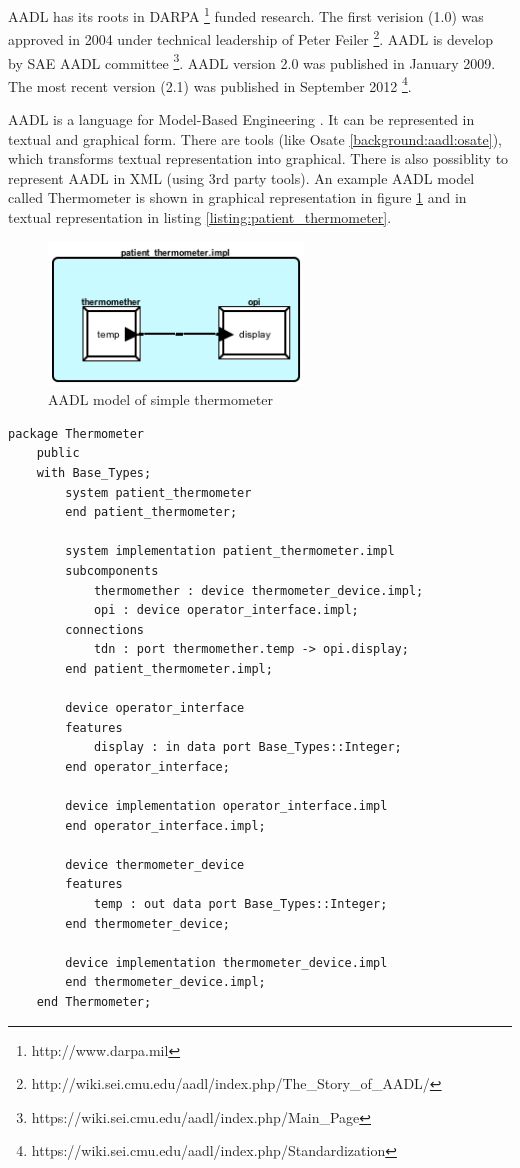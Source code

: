 AADL has its roots in DARPA \footnote{http://www.darpa.mil} funded research. The first verision (1.0) was approved in 2004 under technical leadership of Peter Feiler \footnote{http://wiki.sei.cmu.edu/aadl/index.php/The\_Story\_of\_AADL/}. AADL is develop by SAE AADL committee \footnote{https://wiki.sei.cmu.edu/aadl/index.php/Main\_Page}. AADL version 2.0 was published in January 2009. The most recent version (2.1) was published in September 2012 \footnote{https://wiki.sei.cmu.edu/aadl/index.php/Standardization}.

AADL is a language for Model-Based Engineering \cite{AadlBook}. It can be represented in textual and graphical form. There are tools (like Osate \ref{background:aadl:osate}), which transforms textual representation into graphical. There is also possiblity to represent AADL in XML (using 3rd party tools). An example AADL model called Thermometer is shown in graphical representation in figure \ref{figure:patient_thermometer} and in textual representation in listing \ref{listing:patient_thermometer}.

\begin{figure}[ht]%
    \begin{center}
    	\includegraphics[height=1.5in]{figures/patient_thermometer.png}
    	\caption{AADL model of simple thermometer}
    \end{center}
    \label{figure:patient_thermometer}
\end{figure}

\begin{lstlisting}[language=aadl, frame=single, gobble=0, caption={AADL model of simple thermometer}, label={listing:patient_thermometer}]
	package Thermometer
	public
	with Base_Types;
		system patient_thermometer
		end patient_thermometer;

		system implementation patient_thermometer.impl
		subcomponents
			thermomether : device thermometer_device.impl;
			opi : device operator_interface.impl;
		connections
			tdn : port thermomether.temp -> opi.display;
		end patient_thermometer.impl;

		device operator_interface
		features
			display : in data port Base_Types::Integer;
		end operator_interface;

		device implementation operator_interface.impl
		end operator_interface.impl;

		device thermometer_device
		features
			temp : out data port Base_Types::Integer;
		end thermometer_device;

		device implementation thermometer_device.impl
		end thermometer_device.impl;
	end Thermometer;
\end{lstlisting} 

